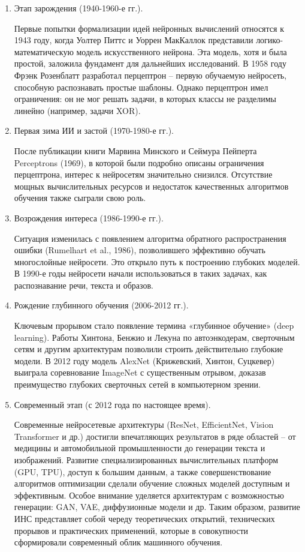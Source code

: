 \begin{enumerate}
	\item Этап зарождения (1940-1960-е гг.).
	
	Первые попытки формализации идей нейронных вычислений относятся к 1943 году, когда Уолтер Питтс и Уоррен МакКаллок представили логико-математическую модель искусственного нейрона. Эта модель, хотя и была простой, заложила фундамент для дальнейших исследований. В 1958 году Фрэнк Розенблатт разработал перцептрон – первую обучаемую нейросеть, способную распознавать простые шаблоны. Однако перцептрон имел ограничения: он не мог решать задачи, в которых классы не разделимы линейно (например, задачи XOR).
	
	\item Первая зима ИИ и застой (1970-1980-е гг.).
	
	После публикации книги Марвина Минского и Сеймура Пейперта Perceptrons (1969), в которой были подробно описаны ограничения перцептрона, интерес к нейросетям значительно снизился. Отсутствие мощных вычислительных ресурсов и недостаток качественных алгоритмов обучения также сыграли свою роль.
	
	\item Возрождения интереса (1986-1990-е гг.).
	
	Ситуация изменилась с появлением алгоритма обратного распространения ошибки (Rumelhart et al., 1986), позволившего эффективно обучать многослойные нейросети. Это открыло путь к построению глубоких моделей. В 1990-е годы нейросети начали использоваться в таких задачах, как распознавание речи, текста и образов.
	
	\item Рождение глубинного обучения (2006-2012 гг.).
	
	Ключевым прорывом стало появление термина «глубинное обучение» (deep learning). Работы Хинтона, Бенжио и Лекуна по автоэнкодерам, сверточным сетям и другим архитектурам позволили строить действительно глубокие модели. В 2012 году модель AlexNet (Крижевский, Хинтон, Суцкевер) выиграла соревнование ImageNet с существенным отрывом, доказав преимущество глубоких сверточных сетей в компьютерном зрении.
	
	\item Современный этап (с 2012 года по настоящее время).
	
	Современные нейросетевые архитектуры (ResNet, EfficientNet, Vision Transformer и др.) достигли впечатляющих результатов в ряде областей – от медицины и автомобильной промышленности до генерации текста и изображений. Развитие специализированных вычислительных платформ (GPU, TPU), доступ к большим данным, а также совершенствование алгоритмов оптимизации сделали обучение сложных моделей доступным и эффективным. Особое внимание уделяется архитектурам с возможностью генерации: GAN, VAE, диффузионные модели и др.
	Таким образом, развитие ИНС представляет собой череду теоретических открытий, технических прорывов и практических применений, которые в совокупности сформировали современный облик машинного обучения.
	
\end{enumerate}


